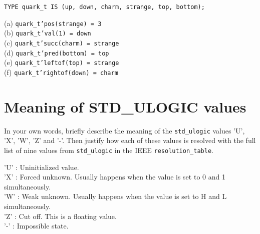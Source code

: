 \documentclass{article}
\begin{document}
\begin{verbatim}
TYPE quark_t IS (up, down, charm, strange, top, bottom);
\end{verbatim} 
(a) \texttt{quark\_t'pos(strange) = 3} \\
(b) \texttt{quark\_t'val(1) = down} \\
(c) \texttt{quark\_t'succ(charm) = strange} \\
(d) \texttt{quark\_t'pred(bottom) = top} \\
(e) \texttt{quark\_t'leftof(top) = strange} \\
(f) \texttt{quark\_t'rightof(down) = charm}

\section{Meaning of STD\_ULOGIC values}

\begin{displayquote}
In your own words, briefly describe the meaning of the \texttt{std\_ulogic} values 'U', 'X', 'W', 'Z' and '-'. Then justify how each of these values is resolved with the full list of nine values from \texttt{std\_ulogic} in the IEEE \texttt{resolution\_table}.
\end{displayquote} 
'U' : Uninitialized value. \\
'X' : Forced unknown. Usually happens when the value is set to 0 and 1 simultaneously. \\ 
'W' : Weak unknown. Usually happens when the value is set to H and L simultaneously. \\
'Z' : Cut off. This is a floating value. \\
'-' : Impossible state.
\end{document}
